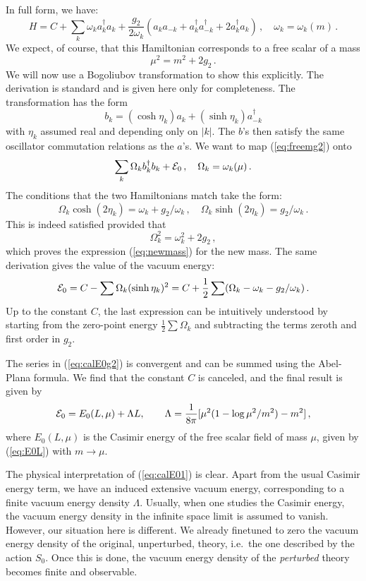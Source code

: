 \documentclass[11pt]{article}
\newcommand{\reef}[1]{(\ref{#1})}
\newcommand{\beq}{\begin{equation}}
\newcommand{\eeq}{\end{equation}}
\def\calE {{\cal E}}
\numberwithin{equation}{section}
\begin{document}
In full form, we have:
\beq
H=C+\sum_k \omega_k a_k^\dagger a_k + \frac{g_2}{2 \omega_k}( a_k a_{-k} + a^\dagger_k a^\dagger_{-k} +2 a^\dagger_k a_k)\,,\quad \omega_k=\omega_k(m)\,.
\label{eq:freemg2}
\eeq
We expect, of course, that this Hamiltonian corresponds to a free scalar of a mass
\beq
\label{eq:newmass}
\mu^2=m^2+2g_2\,.
\eeq
We will now use a Bogoliubov transformation to show this explicitly. The derivation is standard and is given here only for completeness. The transformation has the form
\beq
b_k = (\cosh \eta_k) a_k+(\sinh \eta_k) a_{-k}^\dagger
\eeq
with $\eta_k$ assumed real and depending only on $|k|$. The $b$'s then satisfy the same oscillator commutation relations as the $a$'s. We want to map \reef{eq:freemg2} onto
\beq
\sum_k \Omega_k b_k^\dagger b_k +\calE_0\,,\quad \Omega_k=\omega_k(\mu)\,.
\eeq
The conditions that the two Hamiltonians match take the form:
\beq
\Omega_k \cosh (2\eta_k)= \omega_k+g_2/\omega_k\,,\quad \Omega_k \sinh(2\eta_k) = g_2/\omega_k\,.
\eeq
This is indeed satisfied provided that
\beq
\Omega_k^2=\omega_k^2+2g_2\,,
\eeq
which proves the expression \reef{eq:newmass} for the new mass. The same derivation gives the value of the vacuum energy:
\beq
\label{eq:calE0g2}
\calE_0=C-\sum \Omega_k (\sinh \eta_k)^2=C+\frac 12\sum (\Omega_k-\omega_k- g_2/\omega_k)\,.
\eeq
Up to the constant $C$, the last expression can be intuitively understood \cite{Hogervorst:2014rta} by starting from the zero-point energy $\frac 12 \sum \Omega_k$ and subtracting the terms zeroth and first order in $g_2$. 

The series in \reef{eq:calE0g2} is convergent and can be summed using the Abel-Plana formula. We find that the constant $C$ is canceled, and the final result is given by
\beq
\label{eq:calE01}
\calE_0 = E_0(L,\mu)+\Lambda L,\qquad \Lambda = \frac{1}{8\pi}[\mu^2(1- \log \mu^2/m^2)-m^2]\,,
\eeq
where $E_0(L,\mu)$ is the Casimir energy of the free scalar field of mass $\mu$, given by \reef{eq:E0L} with $m\to\mu$.

The physical interpretation of \reef{eq:calE01} is clear. Apart from the usual Casimir energy term, we have an induced extensive vacuum energy, corresponding to a finite vacuum energy density $\Lambda$. Usually, when one studies the Casimir energy, the vacuum energy density in the infinite space limit is assumed to vanish. However, our situation here is different. We already finetuned to zero the vacuum energy density of the original, unperturbed, theory, i.e.~the one described by the action $S_0$. Once this is done, the vacuum energy density of the \emph{perturbed} theory becomes finite and observable. 
\end{document}
